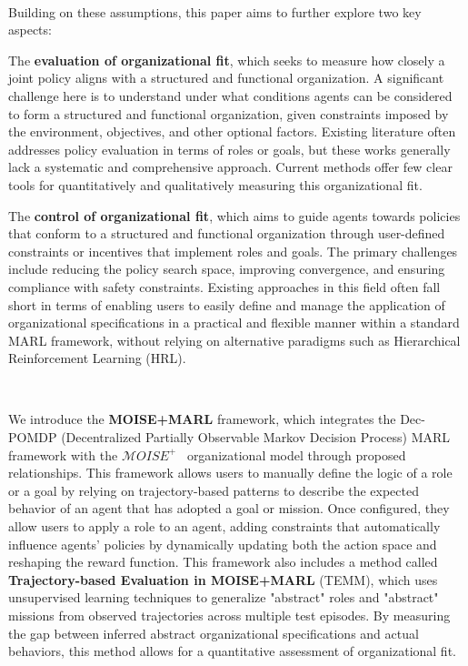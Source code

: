 \documentclass[sigconf,anonymous]{aamas}
\begin{document}
\

Building on these assumptions, this paper aims to further explore two key aspects:
\begin{enumerate*}[label={\roman*)}]
    \item The \textbf{evaluation of organizational fit}, which seeks to measure how closely a joint policy aligns with a structured and functional organization. A significant challenge here is to understand under what conditions agents can be considered to form a structured and functional organization, given constraints imposed by the environment, objectives, and other optional factors.
    Existing literature often addresses policy evaluation in terms of roles or goals, but these works generally lack a systematic and comprehensive approach. Current methods offer few clear tools for quantitatively and qualitatively measuring this organizational fit.
    \item The \textbf{control of organizational fit}, which aims to guide agents towards policies that conform to a structured and functional organization through user-defined constraints or incentives that implement roles and goals.
    The primary challenges include reducing the policy search space, improving convergence, and ensuring compliance with safety constraints.
    Existing approaches in this field often fall short in terms of enabling users to easily define and manage the application of organizational specifications in a practical and flexible manner within a standard MARL framework, without relying on alternative paradigms such as Hierarchical Reinforcement Learning (HRL).
\end{enumerate*}

\

\noindent We introduce the \textbf{MOISE+MARL} framework, which integrates the Dec-POMDP (Decentralized Partially Observable Markov Decision Process) MARL framework with the $\mathcal{M}OISE^+$~\cite{Hubner2007} organizational model through proposed relationships. This framework allows users to manually define the logic of a role or a goal by relying on trajectory-based patterns to describe the expected behavior of an agent that has adopted a goal or mission. Once configured, they allow users to apply a role to an agent, adding constraints that automatically influence agents' policies by dynamically updating both the action space and reshaping the reward function. This framework also includes a method called \textbf{Trajectory-based Evaluation in MOISE+MARL} (TEMM), which uses unsupervised learning techniques to generalize "abstract" roles and "abstract" missions from observed trajectories across multiple test episodes. By measuring the gap between inferred abstract organizational specifications and actual behaviors, this method allows for a quantitative assessment of organizational fit.
\end{document}
